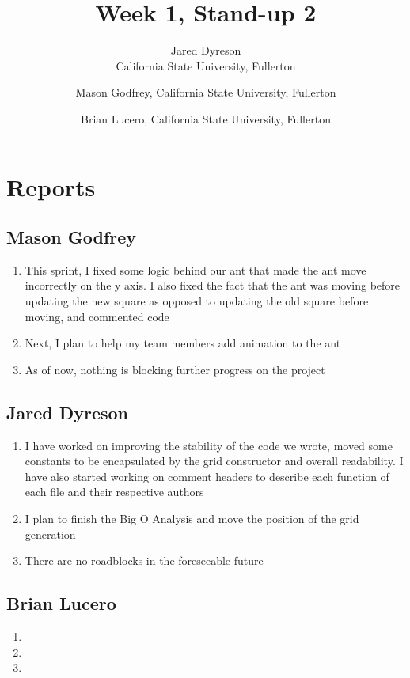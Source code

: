 \documentclass{article}
\title{Week 1, Stand-up 2}
\author{Jared Dyreson\\ California State University, Fullerton 
\and Mason Godfrey, California State University, Fullerton
\and Brian Lucero, California State University, Fullerton}
\begin{document}
\maketitle
\tableofcontents
\newpage

\section{Reports}

\subsection{Mason Godfrey}
\begin{enumerate}
\item This sprint, I fixed some logic behind our ant that made the ant move incorrectly on the y axis. I also fixed the fact that the ant was moving before updating the new square as opposed to updating the old square before moving, and commented code
\item Next, I plan to help my team members add animation to the ant
\item As of now, nothing is blocking further progress on the project
\end{enumerate}

\subsection{Jared Dyreson}
\begin{enumerate}
\item I have worked on improving the stability of the code we wrote, moved some constants to be encapsulated by the grid constructor and overall readability. I have also started working on comment headers to describe each function of each file and their respective authors
\item I plan to finish the Big O Analysis and move the position of the grid generation
\item There are no roadblocks in the foreseeable future
\end{enumerate}

\subsection{Brian Lucero}
\begin{enumerate}
\item <++>
\item <++>
\item <++>
\end{enumerate}
\end{document}
